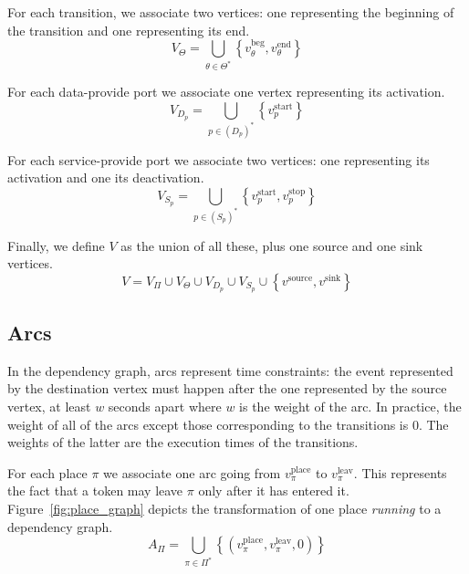 For each transition, we associate two vertices: one representing the
beginning of the transition and one representing its end.
\[
V_{\Theta}=\bigcup_{\theta\in\Theta^*}\left\{ v_\theta^\text{beg},v_\theta^\text{end}\right\} 
\]

For each data-provide port we associate one vertex representing its activation.
\[
V_{D_p}=\bigcup_{p\in\left(D_p\right)^*}\left\{ v_p^\text{start}\right\} 
\]

For each service-provide port we associate two vertices: one representing
its activation and one its deactivation.
\[
V_{S_p}=\bigcup_{p\in\left(S_p\right)^*}\left\{ v_p^\text{start},v_p^\text{stop}\right\} 
\]

Finally, we define $V$ as the union of all these, plus one source
and one sink vertices. 
\[
V=V_{\Pi}\cup V_{\Theta}\cup V_{D_p}\cup V_{S_p}\cup\left\{ v^\text{source},v^\text{sink}\right\} 
\]

\subsection{Arcs}

In the dependency graph, arcs represent time constraints: the event represented
by the destination vertex must happen after the one represented by the source
vertex, at least $w$ seconds apart where $w$ is the weight of the arc. In
practice, the weight of all of the arcs except those corresponding to the
transitions is 0. The weights of the latter are the execution times of the
transitions.

For each place $\pi$ we associate one arc going from $v_\pi^\text{place}$ to
$v_\pi^\text{leav}$. This represents the fact that a token may leave $\pi$
only after it has entered it.
Figure~\ref{fig:place_graph} depicts the transformation of one place
\emph{running} to a dependency graph.
\[
A_{\Pi}=\bigcup_{\pi\in\Pi^*}\left\{ \left(v_\pi^\text{place},v_\pi^\text{leav},0\right)\right\} 
\]



